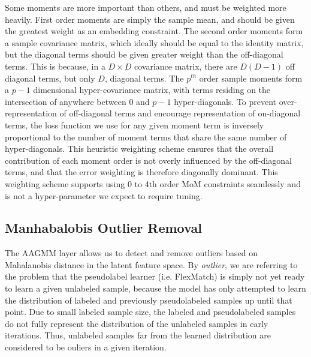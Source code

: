 \documentclass[10pt,twocolumn,letterpaper]{article}
\begin{document}
Some moments are more important than others, and must be weighted more heavily.  
First order moments are simply the sample mean, and should be given the greatest weight as an embedding constraint. 
The second order moments form a sample covariance matrix, which ideally should be equal to the identity matrix, but the diagonal terms should be given greater weight than the off-diagonal terms.  
This is because, in a $D \times D$ covariance matrix, there are $D(D-1)$ off diagonal terms, but only $D$, diagonal terms.  
The $p^{th}$ order sample moments form a $p-1$ dimensional hyper-covariance matrix, with terms residing on the intersection of anywhere between $0$ and $p-1$ hyper-diagonals.  
To prevent over-representation of off-diagonal terms and encourage representation of on-diagonal terms, the loss function we use for any given moment term is inversely proportional to the number of moment terms that share the same number of hyper-diagonals.  
This heuristic weighting scheme ensures that the overall contribution of each moment order is not overly influenced by the off-diagonal terms, and that the error weighting is therefore diagonally dominant.
This weighting scheme supports using 0 to 4th order MoM constraints seamlessly and is not a hyper-parameter we expect to require tuning.

\subsection{Manhabalobis Outlier Removal}


The AAGMM layer allows us to detect and remove outliers based on Mahalanobis distance in the latent feature space.  By \textit{outlier}, we are referring to the problem that the pseudolabel learner (i.e. FlexMatch) is simply not yet ready to learn a given unlabeled sample, because the model has only attempted to learn the distribution of labeled and previously pseudolabeled samples up until that point.  Due to small labeled sample size, the labeled and pseudolabeled samples do not fully represent the distribution of the unlabeled samples in early iterations.  Thus, unlabeled samples far from the learned distribution are considered to be ouliers in a given iteration.
\end{document}
